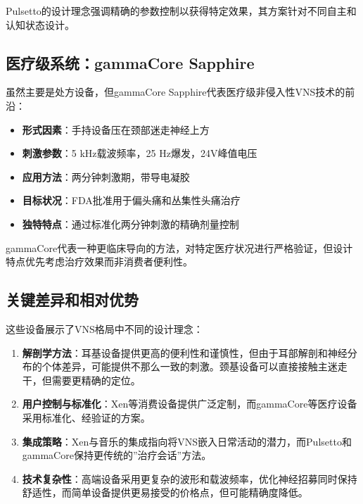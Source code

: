 \documentclass[
  Letterpaper,
]{scrbook}
\providecommand{\tightlist}{%
  \setlength{\itemsep}{0pt}\setlength{\parskip}{0pt}}\usepackage{longtable,booktabs,array}
\begin{document}
Pulsetto的设计理念强调精确的参数控制以获得特定效果，其方案针对不同自主和认知状态设计。

\subsection{医疗级系统：gammaCore
Sapphire}\label{ux533bux7597ux7ea7ux7cfbux7edfgammacore-sapphire}

虽然主要是处方设备，但gammaCore
Sapphire代表医疗级非侵入性VNS技术的前沿：

\begin{itemize}
\tightlist
\item
  \textbf{形式因素}：手持设备压在颈部迷走神经上方
\item
  \textbf{刺激参数}：5 kHz载波频率，25 Hz爆发，24V峰值电压
\item
  \textbf{应用方法}：两分钟刺激期，带导电凝胶
\item
  \textbf{目标状况}：FDA批准用于偏头痛和丛集性头痛治疗
\item
  \textbf{独特特点}：通过标准化两分钟刺激的精确剂量控制
\end{itemize}

gammaCore代表一种更临床导向的方法，对特定医疗状况进行严格验证，但设计特点优先考虑治疗效果而非消费者便利性。

\subsection{关键差异和相对优势}\label{ux5173ux952eux5deeux5f02ux548cux76f8ux5bf9ux4f18ux52bf}

这些设备展示了VNS格局中不同的设计理念：

\begin{enumerate}
\def\labelenumi{\arabic{enumi}.}
\item
  \textbf{解剖学方法}：耳基设备提供更高的便利性和谨慎性，但由于耳部解剖和神经分布的个体差异，可能提供不那么一致的刺激。颈基设备可以直接接触主迷走干，但需要更精确的定位。
\item
  \textbf{用户控制与标准化}：Xen等消费设备提供广泛定制，而gammaCore等医疗设备采用标准化、经验证的方案。
\item
  \textbf{集成策略}：Xen与音乐的集成指向将VNS嵌入日常活动的潜力，而Pulsetto和gammaCore保持更传统的''治疗会话''方法。
\item
  \textbf{技术复杂性}：高端设备采用更复杂的波形和载波频率，优化神经招募同时保持舒适性，而简单设备提供更易接受的价格点，但可能精确度降低。
\end{enumerate}
\end{document}
